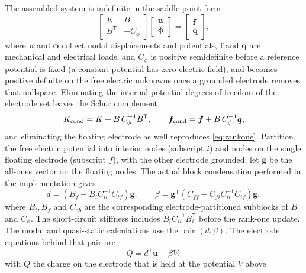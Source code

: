 The assembled system is indefinite in the saddle-point form
\begin{equation}
  \begin{bmatrix} K & B \\ B^{\mathsf T} & -C_\phi \end{bmatrix}
  \begin{bmatrix} \bm{u} \\ \bm{\phi}\end{bmatrix}
  = \begin{bmatrix} \bm{f} \\ \bm{q}\end{bmatrix},
  \label{eq:saddle}
\end{equation}
where $\bm{u}$ and $\bm{\phi}$ collect nodal displacements and potentials,
$\bm{f}$ and $\bm{q}$ are mechanical and electrical loads, and $C_\phi$
is positive semidefinite before a reference potential is fixed (a constant
potential has zero electric field), and becomes positive definite on the
free electric unknowns once a grounded electrode removes that nullspace.
Eliminating the internal potential
degrees of freedom of the electrode set leaves the Schur complement
\begin{equation}
  K_{\rm cond} = K + B\,C_\phi^{-1}B^{\mathsf T},
  \qquad
  \bm{f}_{\rm cond} = \bm{f} + B\,C_\phi^{-1}\bm{q} ,
  \label{eq:schur}
\end{equation}
and eliminating the floating electrode as well reproduces
\eqref{eq:rankone}. Partition the free electric potential into interior
nodes (subscript $i$) and nodes on the single floating electrode
(subscript $f$), with the other electrode grounded; let $\bm g$
be the all-ones vector on the floating nodes. The actual block
condensation performed in the implementation gives
\begin{equation}
  d = (B_f-B_i C_{ii}^{-1}C_{if})\bm g ,\qquad
  \beta = \bm g^{\mathsf T}
  (C_{ff}-C_{fi} C_{ii}^{-1}C_{if})\bm g ,
  \label{eq:dbeta}
\end{equation}
where $B_i,B_f$ and $C_{ab}$ are the corresponding electrode-partitioned
subblocks of $B$ and $C_\phi$. The short-circuit stiffness includes
$B_iC_{ii}^{-1}B_i^{\mathsf T}$ before the rank-one update. The modal and quasi-static calculations use the pair $(d,\beta)$. The electrode
equations behind that pair are
\begin{equation}
  Q = d^{\mathsf T}\bm{u} - \beta V,
  \label{eq:electrode}
\end{equation}
with $Q$ the charge on the electrode that is held at the potential $V$ above
